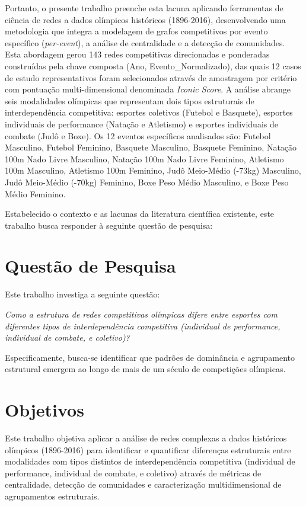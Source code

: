 Portanto, o presente trabalho preenche esta lacuna aplicando ferramentas de ciência de redes a dados olímpicos históricos (1896-2016), desenvolvendo uma metodologia que integra a modelagem de grafos competitivos por evento específico (\textit{per-event}), a análise de centralidade e a detecção de comunidades. Esta abordagem gerou 143 redes competitivas direcionadas e ponderadas construídas pela chave composta (Ano, Evento\_Normalizado), das quais 12 casos de estudo representativos foram selecionados através de amostragem por critério \cite{Palinkas2015Purposeful} com pontuação multi-dimensional denominada \textit{Iconic Score}{}. A análise abrange seis modalidades olímpicas que representam dois tipos estruturais de interdependência competitiva: esportes coletivos (Futebol e Basquete), esportes individuais de performance (Natação e Atletismo) e esportes individuais de combate (Judô e Boxe). Os 12 eventos específicos analisados são: Futebol Masculino, Futebol Feminino, Basquete Masculino, Basquete Feminino, Natação 100m Nado Livre Masculino, Natação 100m Nado Livre Feminino, Atletismo 100m Masculino, Atletismo 100m Feminino, Judô Meio-Médio (-73kg) Masculino, Judô Meio-Médio (-70kg) Feminino, Boxe Peso Médio Masculino, e Boxe Peso Médio Feminino.

Estabelecido o contexto e as lacunas da literatura científica existente, este trabalho busca responder à seguinte questão de pesquisa:

\section{Questão de Pesquisa}

Este trabalho investiga a seguinte questão:

\textit{Como a estrutura de redes competitivas olímpicas difere entre esportes com diferentes tipos de interdependência competitiva (individual de performance, individual de combate, e coletivo)?}

Especificamente, busca-se identificar que padrões de dominância e agrupamento estrutural emergem ao longo de mais de um século de competições olímpicas.

\section{Objetivos}

Este trabalho objetiva aplicar a análise de redes complexas a dados históricos olímpicos (1896-2016) para identificar e quantificar diferenças estruturais entre modalidades com tipos distintos de interdependência competitiva (individual de performance, individual de combate, e coletivo) através de métricas de centralidade, detecção de comunidades e caracterização multidimensional de agrupamentos estruturais.

